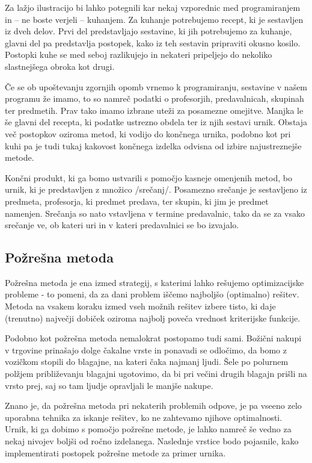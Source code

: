 \documentclass[a4paper,10pt]{article}
\begin{document}
   Za lažjo ilustracijo bi lahko potegnili kar nekaj vzporednic med programiranjem in -- ne
   boste verjeli -- kuhanjem. Za kuhanje potrebujemo recept, ki je sestavljen iz dveh delov.
   Prvi del predstavljajo sestavine, ki jih potrebujemo za kuhanje, glavni del pa predstavlja
   postopek, kako iz teh sestavin pripraviti okusno kosilo. Postopki kuhe se med seboj
   razlikujejo in nekateri pripeljejo do nekoliko slastnejšega obroka kot drugi.
   
   Če se ob upoštevanju zgornjih opomb vrnemo k programiranju, sestavine v našem programu že
   imamo, to so namreč podatki o profesorjih, predavalnicah, skupinah ter predmetih. Prav tako
   imamo izbrane uteži za posamezne omejitve. Manjka le še glavni del recepta, ki podatke
   ustrezno obdela ter iz njih sestavi urnik. Obstaja več postopkov oziroma metod, ki vodijo
   do končnega urnika, podobno kot pri kuhi pa je tudi tukaj kakovost končnega izdelka odvisna
   od izbire najustreznejše metode.
   
   Končni produkt, ki ga bomo ustvarili s pomočjo kasneje omenjenih metod, bo urnik, ki je
   predstavljen z množico /srečanj/. Posamezno srečanje je sestavljeno iz predmeta,
   profesorja, ki predmet predava, ter skupin, ki jim je predmet namenjen. Srečanja so nato
   vstavljena v termine predavalnic, tako da se za vsako srečanje ve, ob kateri uri in v
   kateri predavalnici se bo izvajalo.
   
\subsection{   Požrešna metoda}
   
   Požrešna metoda je ena izmed strategij, s katerimi lahko rešujemo optimizacijske probleme -
   to pomeni, da za dani problem iščemo najboljšo (optimalno) rešitev. Metoda na vsakem koraku
   izmed vseh možnih rešitev izbere  tisto, ki daje (trenutno) največji dobiček oziroma najbolj
   poveča vrednost kriterijske funkcije.
   
   Podobno kot požrešna metoda nemalokrat postopamo tudi sami. Božični nakupi v trgovine
   prinašajo dolge čakalne vrste in ponavadi se odločimo, da bomo z vozičkom stopili do blagajne,
   na kateri čaka najmanj ljudi. Šele po polurnem polžjem približevanju blagajni ugotovimo,
   da bi pri večini drugih blagajn prišli na vrsto prej, saj so tam ljudje opravljali le
   manjše nakupe.
   
   Znano je, da požrešna metoda pri nekaterih problemih odpove, je pa vseeno zelo uporabna
   tehnika za iskanje rešitev, ko ne zahtevamo njihove optimalnosti. Urnik, ki ga dobimo s
   pomočjo požrešne metode, je lahko namreč še vedno za nekaj nivojev boljši od ročno izdelanega.
   Naslednje vrstice bodo pojasnile, kako implementirati postopek požrešne metode za primer urnika.
   
\end{document}
